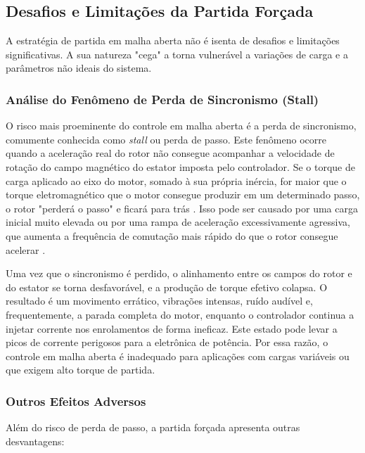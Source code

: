 \subsection{Desafios e Limitações da Partida Forçada}

A estratégia de partida em malha aberta não é isenta de desafios e limitações significativas. A sua natureza "cega" a torna vulnerável a variações de carga e a parâmetros não ideais do sistema.

\subsubsection{Análise do Fenômeno de Perda de Sincronismo (Stall)}

O risco mais proeminente do controle em malha aberta é a perda de sincronismo, comumente conhecida como \textit{stall} ou perda de passo. Este fenômeno ocorre quando a aceleração real do rotor não consegue acompanhar a velocidade de rotação do campo magnético do estator imposta pelo controlador. Se o torque de carga aplicado ao eixo do motor, somado à sua própria inércia, for maior que o torque eletromagnético que o motor consegue produzir em um determinado passo, o rotor "perderá o passo" e ficará para trás \cite{nxp2023sensorless}. Isso pode ser causado por uma carga inicial muito elevada ou por uma rampa de aceleração excessivamente agressiva, que aumenta a frequência de comutação mais rápido do que o rotor consegue acelerar \cite{ti2022minimizing}.

Uma vez que o sincronismo é perdido, o alinhamento entre os campos do rotor e do estator se torna desfavorável, e a produção de torque efetivo colapsa. O resultado é um movimento errático, vibrações intensas, ruído audível e, frequentemente, a parada completa do motor, enquanto o controlador continua a injetar corrente nos enrolamentos de forma ineficaz. Este estado pode levar a picos de corrente perigosos para a eletrônica de potência. Por essa razão, o controle em malha aberta é inadequado para aplicações com cargas variáveis ou que exigem alto torque de partida.

\subsubsection{Outros Efeitos Adversos}

Além do risco de perda de passo, a partida forçada apresenta outras desvantagens:

